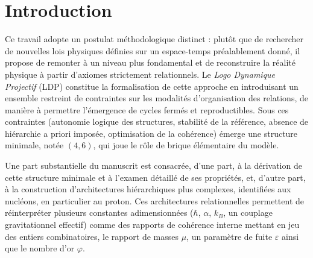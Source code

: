 \documentclass[11pt,a4paper]{article}
\begin{document}
\begin{abstract}
Plusieurs accords numériques sont obtenus dans des marges d’incertitude contrôlées, sans introduction de paramètres continus supplémentaires. Toutefois, certaines constructions demeurent conjecturales ou partiellement ajustées sur les données expérimentales, en particulier pour \(k_B\), la gravitation et la cosmologie. Le texte s’achève sur une esquisse spéculative de scénarios de genèse et de recyclage des fermetures, où des épisodes de type Big Bang et des singularités gravitationnelles extrêmes sont réinterprétés comme des événements de contrainte dans un champ logique pré‑physique. L’ensemble doit être compris comme une proposition de cadre fondationnel en cours d’élaboration, plutôt que comme une théorie pleinement établie.

\end{abstract}

\newpage

\tableofcontents

\newpage

\section*{Introduction}

Ce travail adopte un postulat méthodologique distinct : plutôt que de rechercher de nouvelles lois physiques définies sur un espace-temps préalablement donné, il propose de remonter à un niveau plus fondamental et de reconstruire la réalité physique à partir d’axiomes strictement relationnels. Le \emph{Logo Dynamique Projectif} (LDP) constitue la formalisation de cette approche en introduisant un ensemble restreint de contraintes sur les modalités d’organisation des relations, de manière à permettre l’émergence de cycles fermés et reproductibles. Sous ces contraintes (autonomie logique des structures, stabilité de la référence, absence de hiérarchie a priori imposée, optimisation de la cohérence) émerge une structure minimale, notée \(\left(4,6\right)\), qui joue le rôle de brique élémentaire du modèle.

Une part substantielle du manuscrit est consacrée, d’une part, à la dérivation de cette structure minimale et à l’examen détaillé de ses propriétés, et, d’autre part, à la construction d’architectures hiérarchiques plus complexes, identifiées aux nucléons, en particulier au proton. Ces architectures relationnelles permettent de réinterpréter plusieurs constantes adimensionnées (\(\hbar\), \(\alpha\), \(k_B\), un couplage gravitationnel effectif) comme des rapports de cohérence interne mettant en jeu des entiers combinatoires, le rapport de masses \(\mu\), un paramètre de fuite \(\varepsilon\) ainsi que le nombre d’or \(\varphi\).
\end{document}
